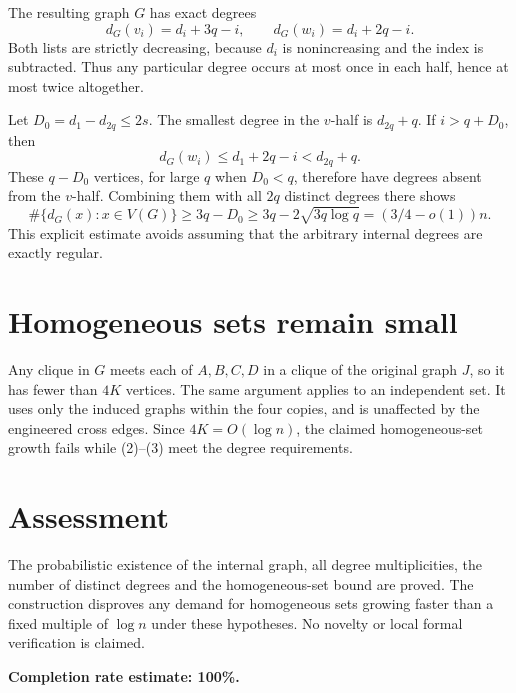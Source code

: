 \documentclass[11pt]{article}
\begin{document}
The resulting graph $G$ has exact degrees
\[
 d_G(v_i)=d_i+3q-i,\qquad d_G(w_i)=d_i+2q-i. \tag{2}
\]
Both lists are strictly decreasing, because $d_i$ is nonincreasing and the index is subtracted. Thus any particular degree occurs at most once in each half, hence at most twice altogether.

Let $D_0=d_1-d_{2q}\le2s$. The smallest degree in the $v$-half is $d_{2q}+q$. If $i>q+D_0$, then
\[
 d_G(w_i)\le d_1+2q-i<d_{2q}+q.
\]
These $q-D_0$ vertices, for large $q$ when $D_0<q$, therefore have degrees absent from the $v$-half. Combining them with all $2q$ distinct degrees there shows
\[
 \#\{d_G(x):x\in V(G)\}\ge3q-D_0\ge3q-2\sqrt{3q\log q}
 =(3/4-o(1))n. \tag{3}
\]
This explicit estimate avoids assuming that the arbitrary internal degrees are exactly regular.

\section*{Homogeneous sets remain small}
Any clique in $G$ meets each of $A,B,C,D$ in a clique of the original graph $J$, so it has fewer than $4K$ vertices. The same argument applies to an independent set. It uses only the induced graphs within the four copies, and is unaffected by the engineered cross edges. Since $4K=O(\log n)$, the claimed homogeneous-set growth fails while (2)--(3) meet the degree requirements.

\section*{Assessment}
The probabilistic existence of the internal graph, all degree multiplicities, the number of distinct degrees and the homogeneous-set bound are proved. The construction disproves any demand for homogeneous sets growing faster than a fixed multiple of $\log n$ under these hypotheses. No novelty or local formal verification is claimed.

\textbf{Completion rate estimate: 100\%.}
\end{document}
